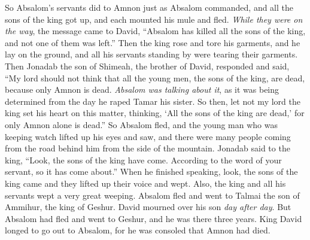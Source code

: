 \begin{biblechapter}
\verse So Absalom’s servants did to Amnon just as Absalom commanded, and all the sons of the king got up, and each mounted his mule and fled.
\verse \textit{While they were on the way}, the message came to David, “Absalom has killed all the sons of the king, and not one of them was left.”
\verse Then the king rose and tore his garments, and he lay on the ground, and all his servants standing by were tearing their garments.
\verse Then Jonadab the son of Shimeah, the brother of David, responded and said, “My lord should not think that all the young men, the sons of the king, are dead, because only Amnon is dead. \textit{Absalom was talking about it}, as it was being determined from the day he raped Tamar his sister.
\verse So then, let not my lord the king set his heart on this matter, thinking, ‘All the sons of the king are dead,’ for only Amnon alone is dead.”
 So Absalom fled, and the young man who was keeping watch lifted up his eyes and saw, and there were many people coming from the road behind him from the side of the mountain.
\verse Jonadab said to the king, “Look, the sons of the king have come. According to the word of your servant, so it has come about.”
\verse When he finished speaking, look, the sons of the king came and they lifted up their voice and wept. Also, the king and all his servants wept a very great weeping.
\verse Absalom fled and went to Talmai the son of Ammihur, the king of Geshur. David mourned over his son \textit{day after day}.
\verse But Absalom had fled and went to Geshur, and he was there three years.
\verse King David longed to go out to Absalom, for he was consoled that Amnon had died.
\end{biblechapter}

